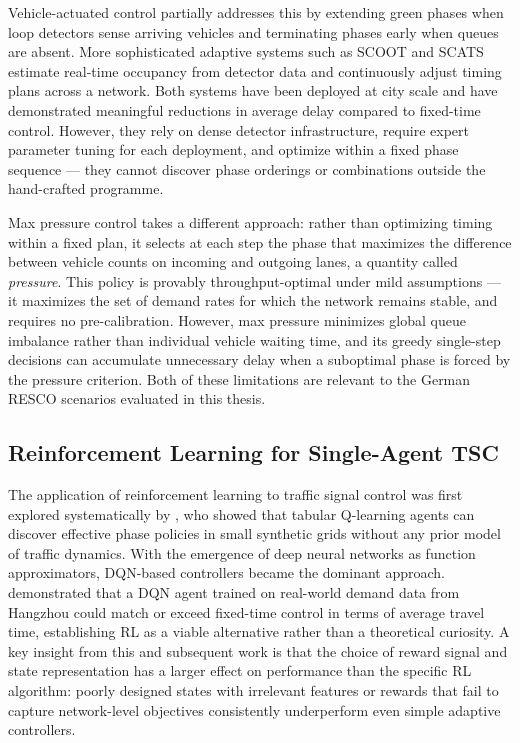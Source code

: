 Vehicle-actuated control partially addresses this by extending green phases when loop detectors sense arriving vehicles and terminating phases early when queues are absent. More sophisticated adaptive systems such as SCOOT \citep{hunt1981scoot} and SCATS \citep{lowrie1990scats} estimate real-time occupancy from detector data and continuously adjust timing plans across a network. Both systems have been deployed at city scale and have demonstrated meaningful reductions in average delay compared to fixed-time control. However, they rely on dense detector infrastructure, require expert parameter tuning for each deployment, and optimize within a fixed phase sequence — they cannot discover phase orderings or combinations outside the hand-crafted programme.

Max pressure control \citep{varaiya2013max} takes a different approach: rather than optimizing timing within a fixed plan, it selects at each step the phase that maximizes the difference between vehicle counts on incoming and outgoing lanes, a quantity called \emph{pressure}. This policy is provably throughput-optimal under mild assumptions — it maximizes the set of demand rates for which the network remains stable, and requires no pre-calibration. However, max pressure minimizes global queue imbalance rather than individual vehicle waiting time, and its greedy single-step decisions can accumulate unnecessary delay when a suboptimal phase is forced by the pressure criterion. Both of these limitations are relevant to the German RESCO scenarios evaluated in this thesis.

\subsection{Reinforcement Learning for Single-Agent TSC}
\label{sec:LiteratureReview_RLTSC}

The application of reinforcement learning to traffic signal control was first explored systematically by \citet{wiering2000multiagent}, who showed that tabular Q-learning agents can discover effective phase policies in small synthetic grids without any prior model of traffic dynamics. With the emergence of deep neural networks as function approximators, DQN-based controllers became the dominant approach. \citet{wei2018intellilight} demonstrated that a DQN agent trained on real-world demand data from Hangzhou could match or exceed fixed-time control in terms of average travel time, establishing RL as a viable alternative rather than a theoretical curiosity. A key insight from this and subsequent work is that the choice of reward signal and state representation has a larger effect on performance than the specific RL algorithm: poorly designed states with irrelevant features or rewards that fail to capture network-level objectives consistently underperform even simple adaptive controllers.

